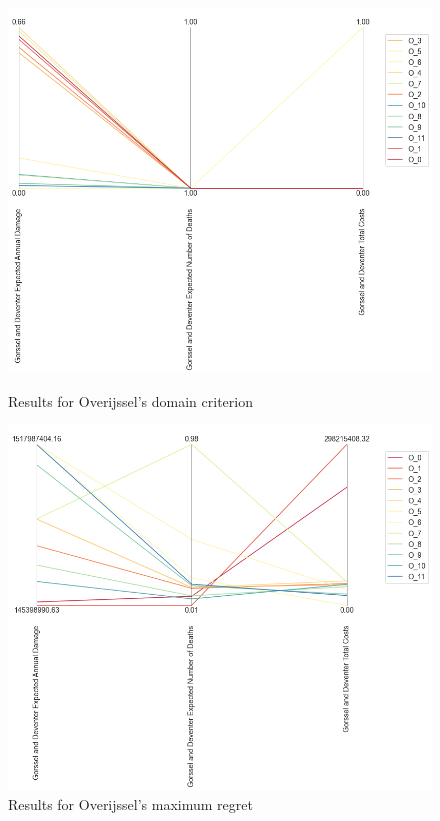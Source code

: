 \begin{figure}[H]
  \centering
  \begin{minipage}[b]{0.4\textwidth}
    \includegraphics[width=1.2\textwidth]{report/figures/results/domain_criterion_Overijssel.png}
    \caption{Results for Overijssel's domain criterion}
    \label{fig:domain_criterion_Overijssels}
  \end{minipage}
  \hfill
  \begin{minipage}[b]{0.4\textwidth}
    \includegraphics[width=1.2\textwidth]{report/figures/results/regret_figure_Overijssel.png}
    \caption{Results for Overijssel's maximum regret}
    \label{fig:regret_Overijssels}
  \end{minipage}
\end{figure}


